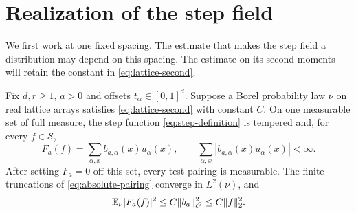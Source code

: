 \documentclass[11pt,letterpaper,reqno]{amsart}
\begin{document}
\section{Realization of the step field}\label{sec:realization}
We first work at one fixed spacing. The estimate that makes the
step field a distribution may depend on this spacing. The estimate
on its second moments will retain the constant in
\eqref{eq:lattice-second}.

\begin{proposition}\label{prop:step-realization}
Fix $d,r\ge1$, $a>0$ and offsets $t_\alpha\in[0,1]^d$.
Suppose a Borel probability law $\nu$ on real lattice arrays
satisfies \eqref{eq:lattice-second} with constant $C$.
On one measurable set of full measure, the step function
\eqref{eq:step-definition} is tempered and, for every $f\in\mathcal S$,
\begin{equation}\label{eq:absolute-pairing}
 F_a(f)=\sum_{\alpha,x}b_{a,\alpha}(x)u_\alpha(x),\qquad
 \sum_{\alpha,x}|b_{a,\alpha}(x)u_\alpha(x)|<\infty.
\end{equation}
After setting $F_a=0$ off this set, every test pairing is measurable.
The finite truncations of \eqref{eq:absolute-pairing} converge in
$L^2(\nu)$, and
\[
 \mathbb E_\nu|F_a(f)|^2\le C\|b_a\|_{\ell^2}^2\le C\|f\|_2^2.
\]
\end{proposition}
\end{document}
